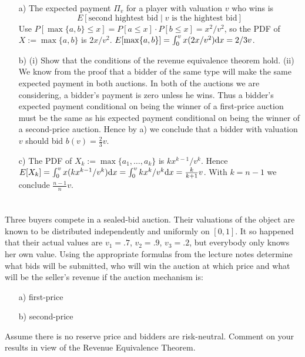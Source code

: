 \documentclass{../ape}
\begin{document}
\begin{solution}
\begin{enumerate}
\item[a)] The expected payment $\Pi_v$ for a player with valuation $v$ who wins is
\[
 E[\text{second hightest bid} \mid v \text{ is the hightest bid}]
\]
Use $P[\max\{a,b\} \leq x] = P[a \leq x]\cdot P[b \leq x] = x^2/v^2$, so the PDF of $X := \max\{a,b\}$ is $2x/v^2$. $ E[\max\{a,b\}] = \int_0^v x (2x/v^2) { \rm d}x = 2/3v $.
\item[b)] (i) Show that the conditions of the revenue equivalence theorem hold. (ii) We know from the proof that a bidder of the same type will make the same expected payment in both auctions. In both of the auctions we are considering, a bidder's payment is zero unless he wins. Thus a bidder's expected payment conditional on being the winner of a first-price auction must be the same as his expected payment conditional on being the winner of a second-price auction. Hence by a) we conclude that a bidder with valuation $v$ should bid $b(v) = \frac{2}{3}v$.
\item[c)]  The PDF of $X_k := \max\{a_1,\dots,a_k\}$ is $k x^{k-1}/v^k$. Hence \\$E[X_k] = \int_0^v x (k x^{k-1}/v^k) { \rm d}x = \int_0^v  k x^{k}/v^k { \rm d}x = \frac{k}{k+1} v $. With $k=n-1$ we conclude $\frac{n-1}{n} v$.
\end{enumerate}
\end{solution}

\section{}
Three buyers compete in a sealed-bid auction. Their valuations of the object are known to be distributed independently and uniformly on $[0,1]$. It so happened that their actual values are $v_1 = .7$, $v_2 = .9$, $v_3 = .2$, but everybody only knows her own value. Using the appropriate formulas from the lecture notes determine what bids will be submitted, who will win the auction at which price and what will be the seller's revenue if the auction mechanism is:
\begin{enumerate}
\item[a)] first-price
\item[b)] second-price
\end{enumerate}
Assume there is no reserve price and bidders are risk-neutral. Comment on your results in view of the Revenue Equivalence Theorem.
\end{document}
